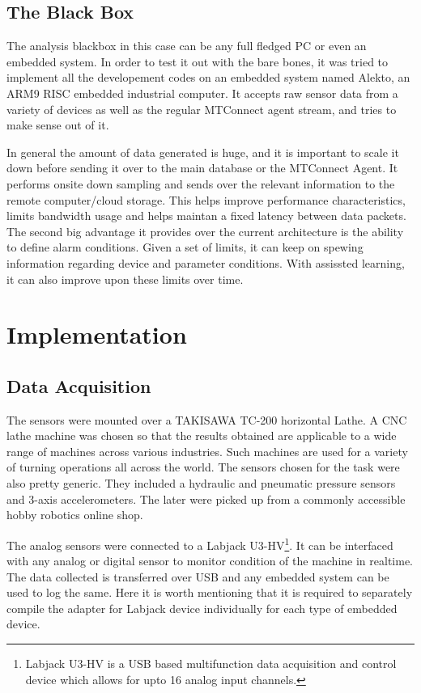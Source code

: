 \documentclass[preprint,authoryear,5p,times,twocolumn]{elsarticle}
\begin{document}
\subsection{The Black Box}
The analysis blackbox in this case can be any full fledged PC or even an embedded system. In order to test it out with the bare bones, it was tried to implement all the developement codes on an embedded system named Alekto, an ARM9 RISC embedded industrial computer. It accepts raw sensor data from a variety of devices as well as the regular MTConnect agent stream, and tries to make sense out of it.

In general the amount of data generated is huge, and it is important to scale it down before sending it over to the main database or the MTConnect Agent. It performs onsite down sampling and sends over the relevant information to the remote computer/cloud storage. This helps improve performance characteristics, limits bandwidth usage and helps maintan a fixed latency between data packets. The second big advantage it provides over the current architecture is the ability to define alarm conditions. Given a set of limits, it can keep on spewing information regarding device and parameter conditions. With assissted learning, it can also improve upon these limits over time.

\section{Implementation}
\label{Implementation}
\subsection{Data Acquisition}
The sensors were mounted over a TAKISAWA TC-200 horizontal Lathe. A CNC lathe machine was chosen so that the results obtained are applicable to a wide range of machines across various industries. Such machines are used for a variety of turning operations all across the world. The sensors chosen for the task were also pretty generic. They included a hydraulic and pneumatic pressure sensors and 3-axis accelerometers. The later were picked up from a commonly accessible hobby robotics online shop.

The analog sensors were connected to a Labjack U3-HV\footnote{Labjack U3-HV is a USB based multifunction data acquisition and control device which allows for upto 16 analog input channels.}. It can be interfaced with any analog or digital sensor to monitor condition of the machine in realtime. The data collected is transferred over USB and any embedded system can be used to log the same. Here it is worth mentioning that it is required to separately compile the adapter for Labjack device individually for each type of embedded device.
\end{document}

